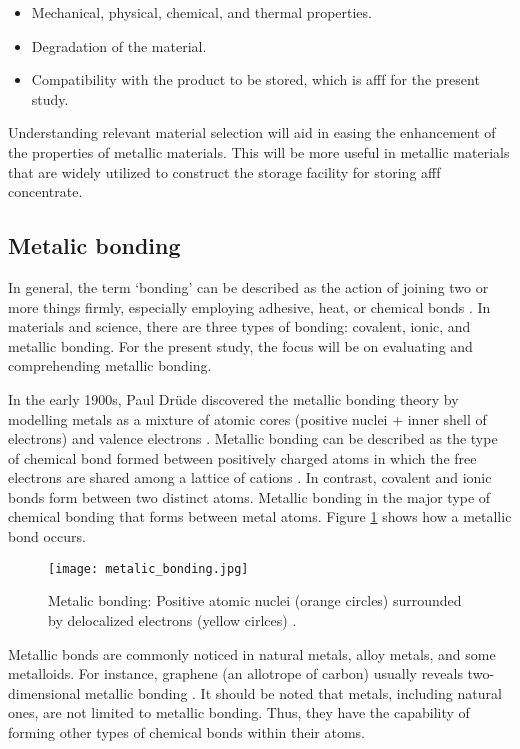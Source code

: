\begin{itemize}
    \item Mechanical, physical, chemical, and thermal properties.
    \item Degradation of the material.
    \item Compatibility with the product to be stored, which is \acrshort{afff} for the present study.
\end{itemize}

Understanding relevant material selection will aid in easing the enhancement of the properties of metallic materials. This will be more useful in metallic materials that are widely utilized to construct the storage facility for storing \acrshort{afff} concentrate. 

\subsection{Metalic bonding}
In general, the term ‘bonding’ can be described as the action of joining two or more things firmly, especially employing adhesive, heat, or chemical bonds \cite{soler2000metallic}. In materials and science, there are three types of bonding: covalent, ionic, and metallic bonding. For the present study, the focus will be on evaluating and comprehending metallic bonding.

In the early 1900s, Paul Drüde discovered the metallic bonding theory by modelling metals as a mixture of atomic cores (positive nuclei + inner shell of electrons) and valence electrons \cite{sinex2017general}. Metallic bonding can be described as the type of chemical bond formed between positively charged atoms in which the free electrons are shared among a lattice of cations \cite{lepetit2017topological}. In contrast, covalent and ionic bonds form between two distinct atoms. Metallic bonding in the major type of chemical bonding that forms between metal atoms. Figure \ref{ch3:figure:bonding} shows how a metallic bond occurs.

\begin{figure}[H]
    \centering
    \texttt{[image: metalic\_bonding.jpg]}
    \caption{Metalic bonding: Positive atomic nuclei (orange circles) surrounded by delocalized electrons (yellow cirlces) \cite{soler2000metallic}.}
    \label{ch3:figure:bonding}
\end{figure}


Metallic bonds are commonly noticed in natural metals, alloy metals, and some metalloids. For instance, graphene (an allotrope of carbon) usually reveals two-dimensional metallic bonding \cite{lepetit2017topological}. It should be noted that metals, including natural ones, are not limited to metallic bonding. Thus, they have the capability of forming other types of chemical bonds within their atoms.

